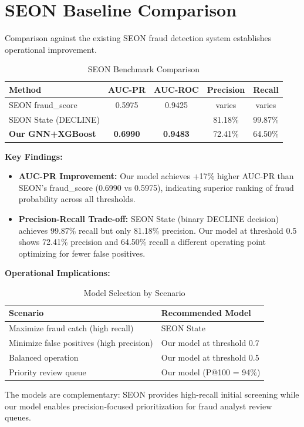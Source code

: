\section{SEON Baseline Comparison}
\label{sec:5_7}

Comparison against the existing SEON fraud detection system establishes operational improvement.

\begin{table}[htbp]
    \centering
    \caption{SEON Benchmark Comparison}
    \label{tab:5_9}
    \begin{tabular}{lcccc}
        \toprule
        Method & AUC-PR & AUC-ROC & Precision & Recall \\
        \midrule
        SEON fraud\_score & 0.5975 & 0.9425 & varies & varies \\
        SEON State (DECLINE) &  &  & 81.18\% & 99.87\% \\
        \textbf{Our GNN+XGBoost} & \textbf{0.6990} & \textbf{0.9483} & 72.41\% & 64.50\% \\
        \bottomrule
    \end{tabular}
\end{table}

\textbf{Key Findings:}

\begin{itemize}
    \item \textbf{AUC-PR Improvement:} Our model achieves +17\% higher AUC-PR than SEON's fraud\_score (0.6990 vs 0.5975), indicating superior ranking of fraud probability across all thresholds.
    \item \textbf{Precision-Recall Trade-off:} SEON State (binary DECLINE decision) achieves 99.87\% recall but only 81.18\% precision. Our model at threshold 0.5 shows 72.41\% precision and 64.50\% recall a different operating point optimizing for fewer false positives.
\end{itemize}

\textbf{Operational Implications:}

\begin{table}[htbp]
    \centering
    \caption{Model Selection by Scenario}
    \label{tab:5_10}
    \begin{tabular}{ll}
        \toprule
        Scenario & Recommended Model \\
        \midrule
        Maximize fraud catch (high recall) & SEON State \\
        Minimize false positives (high precision) & Our model at threshold 0.7 \\
        Balanced operation & Our model at threshold 0.5 \\
        Priority review queue & Our model (P@100 = 94\%) \\
        \bottomrule
    \end{tabular}
\end{table}

The models are complementary: SEON provides high-recall initial screening while our model enables precision-focused prioritization for fraud analyst review queues.
